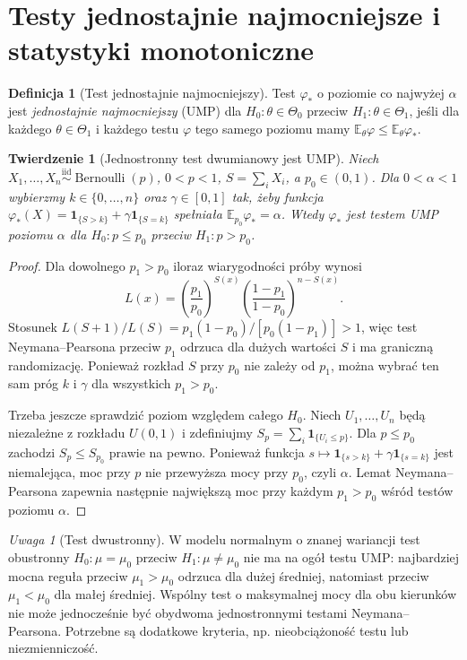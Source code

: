 \documentclass[11pt,a4paper,oneside]{report}
\numberwithin{equation}{chapter}
\theoremstyle{plain}
\newtheorem{twierdzenie}{Twierdzenie}[chapter]
\theoremstyle{definition}
\newtheorem{definicja}{Definicja}[chapter]
\theoremstyle{remark}
\newtheorem{uwaga}{Uwaga}[chapter]
\newcommand{\E}{\mathbb E}
\newcommand{\ind}[1]{\mathbf 1_{#1}}
\newcommand{\iid}{\mathrel{\overset{\mathrm{iid}}\sim}}
\begin{document}
\section{Testy jednostajnie najmocniejsze i statystyki monotoniczne}
\begin{definicja}[Test jednostajnie najmocniejszy]
Test $\varphi_*$ o poziomie co najwyżej $\alpha$ jest
\emph{jednostajnie najmocniejszy} (UMP) dla
$H_0:\theta\in\Theta_0$ przeciw $H_1:\theta\in\Theta_1$,
jeśli dla każdego $\theta\in\Theta_1$ i każdego testu
$\varphi$ tego samego poziomu mamy
$\E_\theta\varphi\le\E_\theta\varphi_*$.
\end{definicja}

\begin{twierdzenie}[Jednostronny test dwumianowy jest UMP]
\label{thm:binomial-ump}
Niech $X_1,\ldots,X_n\iid\operatorname{Bernoulli}(p)$,
$0<p<1$, $S=\sum_iX_i$, a $p_0\in(0,1)$.
Dla $0<\alpha<1$ wybierzmy $k\in\{0,\ldots,n\}$ oraz
$\gamma\in[0,1]$ tak, żeby funkcja
$\varphi_*(X)=\ind{\{S>k\}}+\gamma\ind{\{S=k\}}$
spełniała $\E_{p_0}\varphi_*=\alpha$.
Wtedy $\varphi_*$ jest testem UMP poziomu $\alpha$ dla
$H_0:p\le p_0$ przeciw $H_1:p>p_0$.
\end{twierdzenie}
\begin{proof}
Dla dowolnego $p_1>p_0$ iloraz wiarygodności próby wynosi
\[
 L(x)=\left(\frac{p_1}{p_0}\right)^{S(x)}
 \left(\frac{1-p_1}{1-p_0}\right)^{n-S(x)}.
\]
Stosunek $L(S+1)/L(S)=p_1(1-p_0)/[p_0(1-p_1)]>1$,
więc test Neymana--Pearsona przeciw $p_1$ odrzuca dla
dużych wartości $S$ i ma graniczną randomizację.
Ponieważ rozkład $S$ przy $p_0$ nie zależy od $p_1$,
można wybrać ten sam próg $k$ i $\gamma$ dla wszystkich
$p_1>p_0$.

Trzeba jeszcze sprawdzić poziom względem całego $H_0$.
Niech $U_1,\ldots,U_n$ będą niezależne z rozkładu
$U(0,1)$ i zdefiniujmy $S_p=\sum_i\ind{\{U_i\le p\}}$.
Dla $p\le p_0$ zachodzi $S_p\le S_{p_0}$ prawie na pewno.
Ponieważ funkcja $s\mapsto\ind{\{s>k\}}+
\gamma\ind{\{s=k\}}$ jest niemalejąca, moc przy $p$
nie przewyższa mocy przy $p_0$, czyli $\alpha$.
Lemat Neymana--Pearsona zapewnia następnie największą moc
przy każdym $p_1>p_0$ wśród testów poziomu $\alpha$.
\end{proof}

\begin{uwaga}[Test dwustronny]
W modelu normalnym o znanej wariancji test obustronny
$H_0:\mu=\mu_0$ przeciw $H_1:\mu\ne\mu_0$
nie ma na ogół testu UMP: najbardziej mocna reguła przeciw
$\mu_1>\mu_0$ odrzuca dla dużej średniej, natomiast przeciw
$\mu_1<\mu_0$ dla małej średniej. Wspólny test o maksymalnej
mocy dla obu kierunków nie może jednocześnie być obydwoma
jednostronnymi testami Neymana--Pearsona. Potrzebne są dodatkowe
kryteria, np. nieobciążoność testu lub niezmienniczość.
\end{uwaga}
\end{document}
